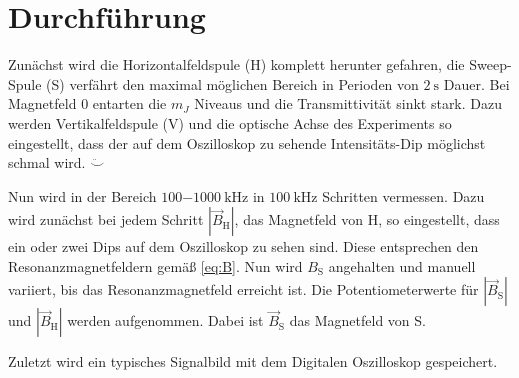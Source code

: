 

\section{Durchführung}
	
	Zunächst wird die Horizontalfeldspule (H) komplett herunter 
		gefahren, die Sweep-Spule (S) verfährt den maximal möglichen 
		Bereich in Perioden von $\SI{2}{\second}$ Dauer. Bei Magnetfeld 
		$0$ 
		entarten die $m_J$ Niveaus und 
		die Transmittivität sinkt stark. Dazu werden Vertikalfeldspule (V) 
		und die optische Achse des Experiments so eingestellt, dass 
		der auf dem Oszilloskop zu sehende Intensitäts-Dip möglichst 
		schmal wird. $\ddot \smile$
	
	
	Nun wird in der Bereich $\SI{100-1000}{\kilo\hertz}$ in 
		$\SI{100}{\kilo\hertz}$ Schritten vermessen. Dazu wird zunächst 
		bei jedem Schritt $|\vec{B}_\text{H}|$, das Magnetfeld von H, so
		 eingestellt, dass ein oder zwei Dips 
		auf dem Oszilloskop zu sehen sind. Diese entsprechen den 
		Resonanzmagnetfeldern gemäß \eqref{eq:B}. 
		Nun wird $B_\text{S}$ angehalten und manuell variiert, bis das 
		Resonanzmagnetfeld 
		erreicht ist. Die Potentiometerwerte für $|\vec{B}_\text{S}|$ und 
		$|\vec{B}_\text{H}|$ werden aufgenommen. Dabei ist 
		$\vec{B}_\text{S}$ das Magnetfeld von S.
	
	 Zuletzt wird ein typisches Signalbild mit dem 
		Digitalen Oszilloskop gespeichert.
	